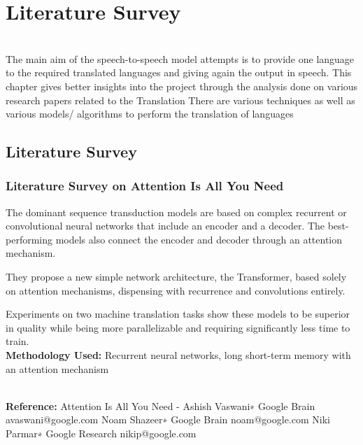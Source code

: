 \chapter{Literature Survey}

\\

The main aim of the speech-to-speech model attempts is to provide one language to the required translated languages and giving again the output in speech. This chapter gives better insights into the project through the analysis done on various research papers related to the Translation
There are various techniques as well as various models/ algorithms to perform the translation of languages
\newpage

\section{Literature Survey}
\subsection{Literature Survey on Attention Is All You Need}
{\normalsize{\par The dominant sequence transduction models are based on complex recurrent or convolutional neural networks that include an encoder and a decoder. The best-performing models also connect the encoder and decoder through an attention mechanism. 
\par They propose a new simple network architecture, the Transformer, based solely on attention mechanisms, dispensing with recurrence and convolutions entirely.
\par Experiments on two machine translation tasks show these models to be superior in quality while being more parallelizable and requiring significantly less time to train.
\newline
\\
{\textbf{Methodology Used:}} Recurrent neural networks, long short-term memory with an attention mechanism
} }
\newline
\\
{\textbf{Reference:} Attention Is All You Need -  Ashish Vaswani∗ Google Brain avaswani@google.com Noam Shazeer∗ Google Brain noam@google.com Niki Parmar∗ Google Research nikip@google.com}

\newpage

